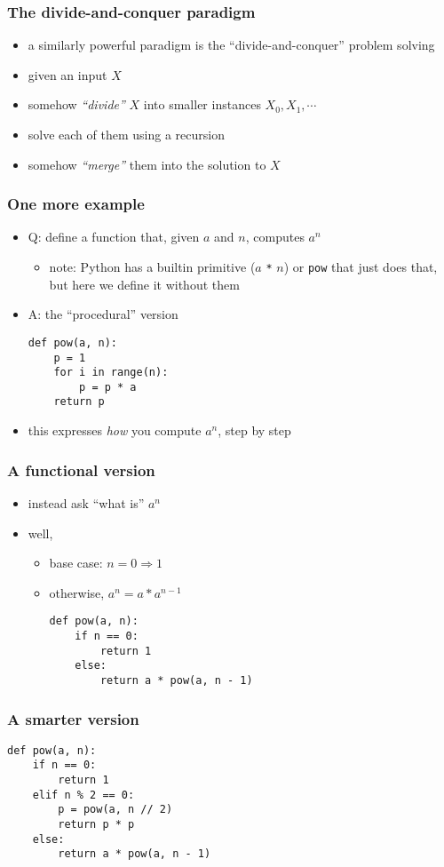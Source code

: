 \documentclass[12pt,dvipdfmx]{beamer}
\newcommand{\ao}[1]{{\color{blue}#1}}
\begin{document}
\begin{frame}
  \frametitle{The divide-and-conquer paradigm}
  \begin{itemize}
  \item a similarly powerful paradigm
    is the ``divide-and-conquer'' problem solving
  \item given an input $X$
  \item somehow \ao{\it ``divide''} $X$ into smaller
    instances $X_0, X_1, \cdots$
  \item solve each of them using a recursion
  \item somehow \ao{\it ``merge''} them into the solution to $X$
  \end{itemize}
\end{frame}

\begin{frame}[fragile]
  \frametitle{One more example}
  \begin{itemize}
  \item Q: define a function that, given $a$ and $n$, computes $a^n$
    \begin{itemize}
    \item note: Python has a builtin primitive ($a$ {\tt **} $n$) or {\tt pow}
      that just does that, but here we define it without them
    \end{itemize}
  \item A: the ``procedural'' version
\begin{lstlisting}
def pow(a, n):
    p = 1
    for i in range(n):
        p = p * a
    return p
\end{lstlisting}
  \item this expresses \ao{\it how} you compute $a^n$, step by step
  \end{itemize}
\end{frame}

\begin{frame}[fragile]
  \frametitle{A functional version}
  \begin{itemize}
  \item instead ask ``what is'' $a^n$
  \item well,
    \begin{itemize}
    \item base case: $n = 0 \Rightarrow 1$
    \item otherwise, $a^n = a * a^{n-1}$
\begin{lstlisting}
def pow(a, n):
    if n == 0:
        return 1
    else:
        return a * pow(a, n - 1)
\end{lstlisting}
    \end{itemize}
  \end{itemize}
\end{frame}  

\begin{frame}[fragile]
  \frametitle{A smarter version}
\begin{lstlisting}
def pow(a, n):
    if n == 0:
        return 1
    elif n % 2 == 0:
        p = pow(a, n // 2)
        return p * p
    else:
        return a * pow(a, n - 1)
\end{lstlisting}
\end{frame}  
\end{document}

